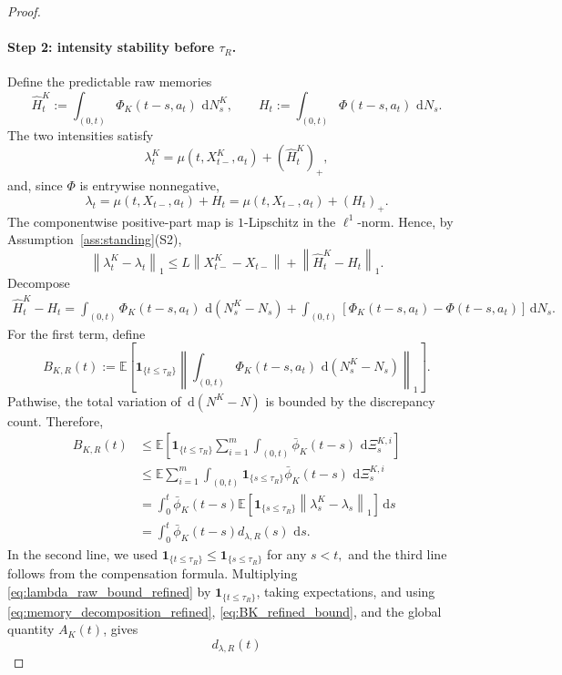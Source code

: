 \documentclass[11pt]{article}
\theoremstyle{remarkitalic}
\theoremstyle{remarkitalic}
\newcommand{\E}{\mathbb E}
\newcommand{\dd}{\,\mathrm d}
\newcommand{\1}{\mathbf 1}
\newcommand{\norm}[1]{\left\lVert #1 \right\rVert}
\begin{document}
{\begin{proof}
\paragraph{Step 2: intensity stability before $\tau_R$.}

Define the predictable raw memories
\[
\widehat H_t^K
:=
\int_{(0,t)}
\Phi_K(t-s,a_t)\,\dd N_s^K,
\qquad
H_t
:=
\int_{(0,t)}
\Phi(t-s,a_t)\,\dd N_s.
\]
The two intensities satisfy
\[
\lambda_t^K
=
\mu(t,X_{t-}^K,a_t)+(\widehat H_t^K)_+,
\]
and, since $\Phi$ is entrywise nonnegative,
\[
\lambda_t
=
\mu(t,X_{t-},a_t)+H_t
=
\mu(t,X_{t-},a_t)+(H_t)_+.
\]
The componentwise positive-part map is $1$-Lipschitz in the
$\ell^1$-norm. Hence, by
Assumption~\ref{ass:standing}(S2),
\begin{equation}
\label{eq:lambda_raw_bound_refined}
\norm{\lambda_t^K-\lambda_t}_1
\leq
L\norm{X_{t-}^K-X_{t-}}
+
\norm{\widehat H_t^K-H_t}_1.
\end{equation} Decompose
\begin{align}
\label{eq:memory_decomposition_refined}
\widehat H_t^K-H_t
=
\int_{(0,t)}
\Phi_K(t-s,a_t)\,
\dd(N_s^K-N_s)
+
\int_{(0,t)}
\left[
    \Phi_K(t-s,a_t)-\Phi(t-s,a_t)
\right]\dd N_s.
\end{align} For the first term, define
\[
B_{K,R}(t)
:=
\E\left[
\mathbf 1_{\{t\leq\tau_R\}}
\left\|
    \int_{(0,t)}
    \Phi_K(t-s,a_t)\,
    \dd(N_s^K-N_s)
\right\|_1
\right].
\]
Pathwise, the total variation of
$\dd(N^K-N)$ is bounded by the discrepancy count. Therefore,
\begin{align}
B_{K,R}(t)
&\leq
\E\left[
\mathbf 1_{\{t\leq\tau_R\}}
\sum_{i=1}^m
\int_{(0,t)}
\bar\phi_K(t-s)\,
\dd\Xi_s^{K,i}
\right]
\nonumber\\
&\leq
\E\sum_{i=1}^m
\int_{(0,t)}
\mathbf 1_{\{s\leq\tau_R\}}
\bar\phi_K(t-s)\,
\dd\Xi_s^{K,i}
\nonumber\\
&=
\int_0^t
\bar\phi_K(t-s)
\E\left[
    \mathbf 1_{\{s\leq\tau_R\}}
    \norm{\lambda_s^K-\lambda_s}_1
\right]\dd s
\nonumber\\
&=
\int_0^t
\bar\phi_K(t-s)
d_{\lambda,R}(s)\,\dd s.
\label{eq:BK_refined_bound}
\end{align}
In the second line, we used $\mathbf 1_{\{t\leq\tau_R\}}
\leq
\mathbf 1_{\{s\leq\tau_R\}}$ for any $s<t,$
and the third line follows from the compensation formula. Multiplying \eqref{eq:lambda_raw_bound_refined} by
$\mathbf 1_{\{t\leq\tau_R\}}$, taking expectations, and using
\eqref{eq:memory_decomposition_refined},
\eqref{eq:BK_refined_bound}, and the global quantity $A_K(t)$,
gives
\[
d_{\lambda,R}(t)
\]
\end{proof}}
\end{document}
